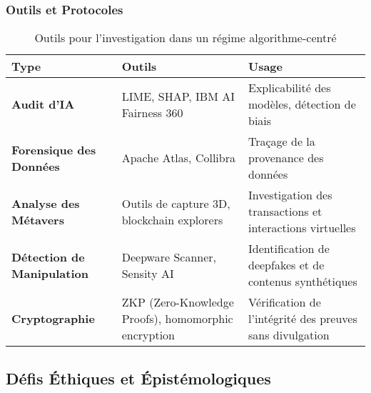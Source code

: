 \documentclass[a4paper,12pt]{report}
\begin{document}
	\subsubsection{Outils et Protocoles}
	\begin{table}[h]
		\centering
		\caption{Outils pour l’investigation dans un régime algorithme-centré}
		\label{tab:outils_2050}
		\begin{tabular}{|p{3cm}|p{5cm}|p{5cm}|}
			\hline
			\textbf{Type} & \textbf{Outils} & \textbf{Usage} \\ \hline
			\textbf{Audit d’IA} & LIME, SHAP, IBM AI Fairness 360 & Explicabilité des modèles, détection de biais \\ \hline
			\textbf{Forensique des Données} & Apache Atlas, Collibra & Traçage de la provenance des données \\ \hline
			\textbf{Analyse des Métavers} & Outils de capture 3D, blockchain explorers & Investigation des transactions et interactions virtuelles \\ \hline
			\textbf{Détection de Manipulation} & Deepware Scanner, Sensity AI & Identification de deepfakes et de contenus synthétiques \\ \hline
			\textbf{Cryptographie} & ZKP (Zero-Knowledge Proofs), homomorphic encryption & Vérification de l’intégrité des preuves sans divulgation \\ \hline
		\end{tabular}
	\end{table}
	
	\subsection*{Défis Éthiques et Épistémologiques}
\end{document}
